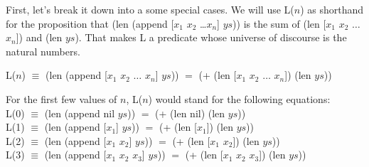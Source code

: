 First, let's break it down into a some special cases.
We will use L($n$) as shorthand for the proposition that
\textsf{(len (append [$x_1$ $x_2$ \dots $x_n$] $ys$))}
is the sum of \textsf{(len [$x_1$ $x_2$ $\dots$ $x_n$])} and \textsf{(len $ys$)}.
That makes L a predicate whose universe of discourse is
the natural numbers.
\label{additive-concat-law-predicate}
\begin{center}
L($n$) $\equiv$ \textsf{(len (append [$x_1$ $x_2$ $\dots$ $x_n$] $ys$))} $=$
\textsf{(+ (len [$x_1$ $x_2$ $\dots$ $x_n$]) (len $ys$))}
\end{center}

For the first few values of $n$, L($n$) would stand for the following equations:\\
\hspace*{1cm}L(0) $\equiv$ \textsf{(len (append nil $ys$))} $=$ \textsf{(+ (len nil) (len $ys$))} \\
\hspace*{1cm}L(1) $\equiv$ \textsf{(len (append [$x_1$] $ys$))} $=$ \textsf{(+ (len [$x_1$]) (len $ys$))} \\
\hspace*{1cm}L(2) $\equiv$ \textsf{(len (append [$x_1$ $x_2$] $ys$))} $=$ \textsf{(+ (len [$x_1$ $x_2$]) (len $ys$))} \\
\hspace*{1cm}L(3) $\equiv$ \textsf{(len (append [$x_1$ $x_2$ $x_3$] $ys$))} $=$ \textsf{(+ (len [$x_1$ $x_2$ $x_3$]) (len $ys$))} \\

